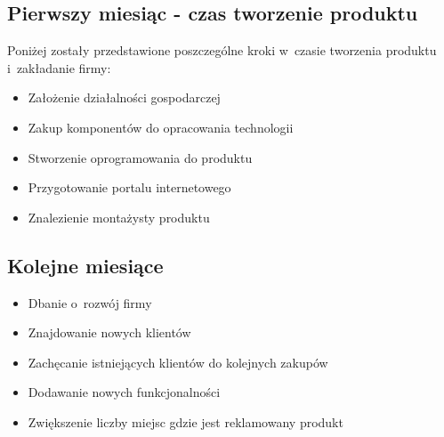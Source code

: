 \documentclass[../main.tex]{subfiles}
\begin{document}
 {

    \subsection{Pierwszy miesiąc - czas tworzenie produktu}
    \label{chapter6:harmonogram_realizacji:przed_wdrozeniem} {
        Poniżej zostały przedstawione poszczególne kroki w~czasie tworzenia produktu
        i~zakładanie firmy:
        \begin{itemize}
            \item Założenie działalności gospodarczej
            \item Zakup komponentów do opracowania technologii
            \item Stworzenie oprogramowania do produktu
            \item Przygotowanie portalu internetowego
            \item Znalezienie montażysty produktu
        \end{itemize}
    }

    \subsection{Kolejne miesiące}
    \label{chapter6:harmonogram_realizacji:po_wdrozeniu} {
        \begin{itemize}
            \item Dbanie o~rozwój firmy
            \item Znajdowanie nowych klientów
            \item Zachęcanie istniejących klientów do kolejnych zakupów
            \item Dodawanie nowych funkcjonalności
            \item Zwiększenie liczby miejsc gdzie jest reklamowany produkt
        \end{itemize}
    }
}
\end{document}
